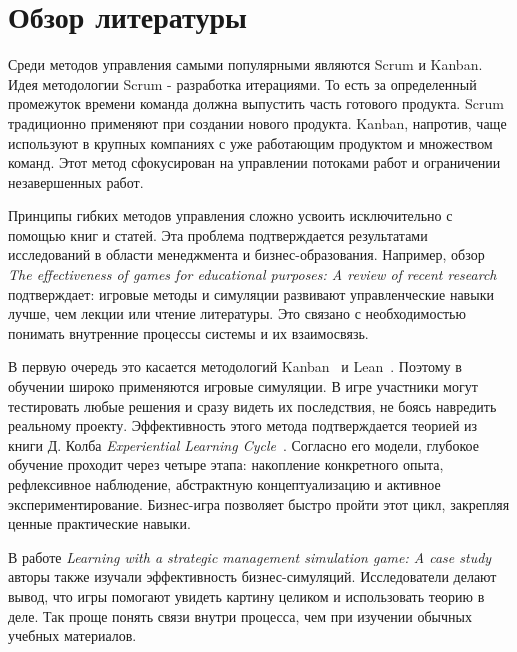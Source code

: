\section{Обзор литературы}
Среди методов управления самыми популярными являются Scrum и Kanban. Идея методологии Scrum - разработка итерациями. То есть за определенный промежуток времени команда должна выпустить часть готового продукта. Scrum традиционно применяют при создании нового продукта. Kanban, напротив, чаще используют в крупных компаниях с уже работающим продуктом и множеством команд. Этот метод сфокусирован на управлении потоками работ и ограничении незавершенных работ.

Принципы гибких методов управления сложно усвоить исключительно с помощью книг и статей. Эта проблема подтверждается результатами исследований в области менеджмента и бизнес-образования. Например, обзор \textit{The effectiveness of games for educational purposes: A review of recent research}~\cite{games-for-edu} подтверждает: игровые методы и симуляции развивают управленческие навыки лучше, чем лекции или чтение литературы. Это связано с необходимостью понимать внутренние процессы системы и их взаимосвязь.

В первую очередь это касается методологий Kanban~\cite{kanban-book-bor} и Lean~\cite{lean-book}. Поэтому в обучении широко применяются игровые симуляции. В игре участники могут тестировать любые решения и сразу видеть их последствия, не боясь навредить реальному проекту. Эффективность этого метода подтверждается теорией из книги Д. Колба \textit{Experiential Learning Cycle}~\cite{kolb}. Согласно его модели, глубокое обучение проходит через четыре этапа: накопление конкретного опыта, рефлексивное наблюдение, абстрактную концептуализацию и активное экспериментирование. Бизнес-игра позволяет быстро пройти этот цикл, закрепляя ценные практические навыки.

В работе \textit{Learning with a strategic management simulation game: A case study}~\cite{learning-with-simulation} авторы также изучали эффективность бизнес-симуляций. Исследователи делают вывод, что игры помогают увидеть картину целиком и использовать теорию в деле. Так проще понять связи внутри процесса, чем при изучении обычных учебных материалов.

